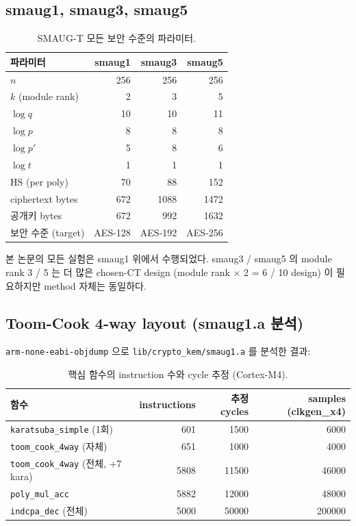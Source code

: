 \documentclass[11pt]{article}
\theoremstyle{plain}
\theoremstyle{definition}
\theoremstyle{remark}
\newcommand{\HS}{\mathrm{HS}}
\begin{document}
\subsection{smaug1, smaug3, smaug5}

\begin{table}[h!]
\centering
\caption{SMAUG-T 모든 보안 수준의 파라미터.}
\label{tab:smaug-all}
\small
\begin{tabular}{lrrr}
\toprule
파라미터 & smaug1 & smaug3 & smaug5 \\
\midrule
$n$ & 256 & 256 & 256 \\
$k$ (module rank) & 2 & 3 & 5 \\
$\log q$ & 10 & 10 & 11 \\
$\log p$ & 8 & 8 & 8 \\
$\log p'$ & 5 & 8 & 6 \\
$\log t$ & 1 & 1 & 1 \\
$\HS$ (per poly) & 70 & 88 & 152 \\
ciphertext bytes & 672 & 1088 & 1472 \\
공개키 bytes & 672 & 992 & 1632 \\
보안 수준 (target) & AES-128 & AES-192 & AES-256 \\
\bottomrule
\end{tabular}
\end{table}

본 논문의 모든 실험은 smaug1 위에서 수행되었다. smaug3 / smaug5 의 module
rank 3 / 5 는 더 많은 chosen-CT design (module rank $\times$ 2 = 6 / 10 design)
이 필요하지만 method 자체는 동일하다.

\subsection{Toom-Cook 4-way layout (smaug1.a 분석)}

\texttt{arm-none-eabi-objdump} 으로 \texttt{lib/crypto\_kem/smaug1.a} 를 분석한
결과:

\begin{table}[h!]
\centering
\caption{핵심 함수의 instruction 수와 cycle 추정 (Cortex-M4).}
\label{tab:toom-cook}
\small
\begin{tabular}{lrrr}
\toprule
함수 & instructions & 추정 cycles & samples (clkgen\_x4) \\
\midrule
\texttt{karatsuba\_simple} (1회) & 601 & ~1500 & ~6000 \\
\texttt{toom\_cook\_4way} (자체) & 651 & ~1000 & ~4000 \\
\texttt{toom\_cook\_4way} (전체, +7 kara) & 5808 & ~11500 & ~46000 \\
\texttt{poly\_mul\_acc} & 5882 & ~12000 & ~48000 \\
\texttt{indcpa\_dec} (전체) & ~5000 & ~50000 & ~200000 \\
\bottomrule
\end{tabular}
\end{table}
\end{document}
